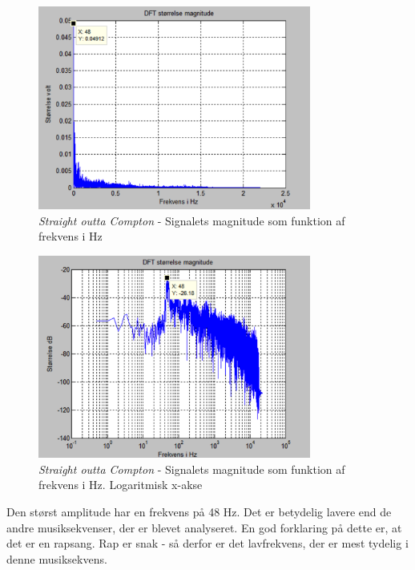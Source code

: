 \begin{figure}[H]
	\centering
	\includegraphics[width=0.8\textwidth]{Figurer/Snip20151001_17}
	\caption{\textit{Straight outta Compton} - Signalets magnitude som funktion af frekvens i Hz}
\end{figure}

\begin{figure}[H]
	\centering
	\includegraphics[width=0.8\textwidth]{Figurer/Snip20151001_18}
	\caption{\textit{Straight outta Compton} - Signalets magnitude som funktion af frekvens i Hz. Logaritmisk x-akse}
\end{figure} 

Den størst amplitude har en frekvens på 48 Hz. Det er betydelig lavere end de andre musiksekvenser, der er blevet analyseret. En god forklaring på dette er, at det er en rapsang. Rap er snak - så derfor er det lavfrekvens, der er mest tydelig i denne musiksekvens.  

